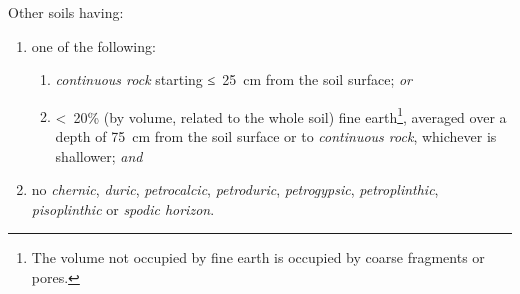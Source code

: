 \documentclass[
  letterpaper,
  DIV=11,
  numbers=noendperiod]{scrreprt}
\providecommand{\tightlist}{%
  \setlength{\itemsep}{0pt}\setlength{\parskip}{0pt}}\usepackage{longtable,booktabs,array}
\begin{document}
Other soils having:

\begin{enumerate}
\def\labelenumi{\arabic{enumi}.}
\tightlist
\item
  one of the following:

  \begin{enumerate}
  \def\labelenumii{\alph{enumii}.}
  \tightlist
  \item
    \emph{continuous rock} starting ≤~25~cm from the soil surface;
    \emph{or}
  \item
    \textless~20\% (by volume, related to the whole soil) fine
    earth\footnote{The volume not occupied by fine earth is occupied by
      coarse fragments or pores.}, averaged over a depth of 75~cm from
    the soil surface or to \emph{continuous rock}, whichever is
    shallower; \emph{and}
  \end{enumerate}
\item
  no \emph{chernic}, \emph{duric}, \emph{petrocalcic},
  \emph{petroduric}, \emph{petrogypsic}, \emph{petroplinthic},
  \emph{pisoplinthic} or \emph{spodic horizon}.
\end{enumerate}
\end{document}
